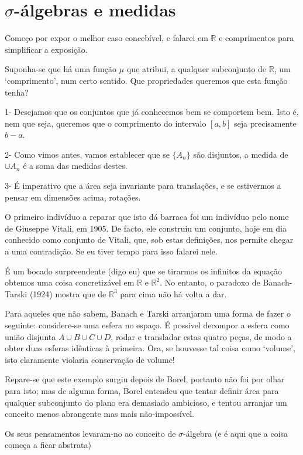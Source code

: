 \documentclass{article}
\newcommand{\R}{\mathbb{R}}
\begin{document}
\section{$\sigma$-álgebras e medidas}

Começo por expor o melhor caso concebível, e falarei em $\R$ e comprimentos para simplificar a exposição.

Suponha-se que há uma função $\mu$ que atribui, a qualquer subconjunto de $\R$, um `comprimento', num certo sentido. Que propriedades queremos que esta função tenha?

1- Desejamos que os conjuntos que já conhecemos bem se comportem bem. Isto é, nem que seja, queremos que o comprimento do intervalo $[a,b]$ seja precisamente $b-a$.

2- Como vimos antes, vamos establecer que se $\{A_n\}$ são disjuntos, a medida de $\cup A_n$ é a soma das medidas destes.

3- É imperativo que a área seja invariante para translações, e se estivermos a pensar em dimensões acima, rotações.

O primeiro indivíduo a reparar que isto dá barraca foi um indivíduo pelo nome de Giuseppe Vitali, em 1905. De facto, ele construiu um conjunto, hoje em dia conhecido como conjunto de Vitali, que, sob estas definições, nos permite chegar a uma contradição. Se eu tiver tempo para isso falarei nele.

É um bocado surpreendente (digo eu) que se tirarmos os infinitos da equação obtemos uma coisa concretizável em $\R$ e $\R^2$. No entanto, o paradoxo de Banach-Tarski (1924) mostra que de $\R^3$ para cima não há volta a dar.

Para aqueles que não sabem, Banach e Tarski arranjaram uma forma de fazer o seguinte: considere-se uma esfera no espaço. É possivel decompor a esfera como união disjunta $A \cup B \cup C \cup D$, rodar e transladar estas quatro peças, de modo a obter duas esferas idênticas à primeira. Ora, se houvesse tal coisa como `volume', isto claramente violaria conservação de volume!

Repare-se que este exemplo surgiu depois de Borel, portanto não foi por olhar para isto; mas de alguma forma, Borel entendeu que tentar definir área para qualquer subconjunto do plano era demasiado ambicioso, e tentou arranjar um conceito menos abrangente mas mais não-impossível.


Os seus pensamentos levaram-no ao conceito de $\sigma$-álgebra (e é aqui que a coisa começa a ficar abstrata)
\end{document}
